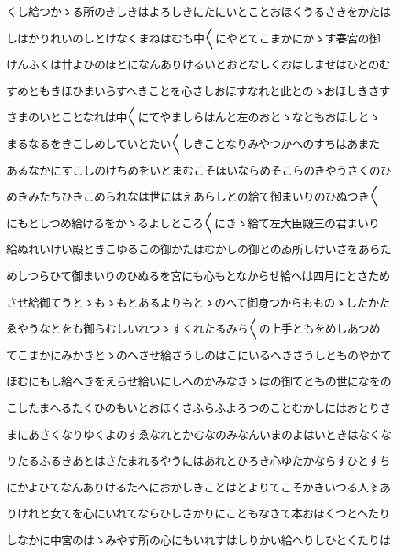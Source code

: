 \documentclass[a4paper,11pt,landscape]{ltjtarticle}
\begin{document}
\par\medskip
くし給つかゝる所のきしきはよろしきにたにいとことおほくうるさきをかたは
\par\medskip
しはかりれいのしとけなくまねはむも中〱にやとてこまかにかゝす春宮の御
\par\medskip
けんふくは廿よひのほとになんありけるいとおとなしくおはしませはひとのむ
\par\medskip
すめともきほひまいらすへきことを心さしおほすなれと此とのゝおほしきさす
\par\medskip
さまのいとことなれは中〱にてやましらはんと左のおとゝなともおほしとゝ
\par\medskip
まるなるをきこしめしていとたい〱しきことなりみやつかへのすちはあまた
\par\medskip
あるなかにすこしのけちめをいとまむこそほいならめそこらのきやうさくのひ
\par\medskip
めきみたちひきこめられなは世にはえあらしとの給て御まいりのひぬつき〱
\par\medskip
にもとしつめ給けるをかゝるよしところ〱にきゝ給て左大臣殿三の君まいり
\par\medskip
給ぬれいけい殿ときこゆるこの御かたはむかしの御とのゐ所しけいさをあらた
\par\medskip
めしつらひて御まいりのひぬるを宮にも心もとなからせ給へは四月にとさため
\par\medskip
させ給御てうとゝもゝもとあるよりもとゝのへて御身つからもものゝしたかた
\par\medskip
ゑやうなとをも御らむしいれつゝすくれたるみち〱の上手ともをめしあつめ
\par\medskip
てこまかにみかきとゝのへさせ給さうしのはこにいるへきさうしとものやかて
\par\medskip
ほむにもし給へきをえらせ給いにしへのかみなきゝはの御てともの世になをの
\par\medskip
こしたまへるたくひのもいとおほくさふらふよろつのことむかしにはおとりさ
\par\medskip
まにあさくなりゆくよのすゑなれとかむなのみなんいまのよはいときはなくな
\par\medskip
りたるふるきあとはさたまれるやうにはあれとひろき心ゆたかならすひとすち
\par\medskip
にかよひてなんありけるたへにおかしきことはとよりてこそかきいつる人〻あ
\par\medskip
りけれと女てを心にいれてならひしさかりにこともなきて本おほくつとへたり
\par\medskip
しなかに中宮のはゝみやす所の心にもいれすはしりかい給へりしひとくたりは
\par\medskip
\end{document}
